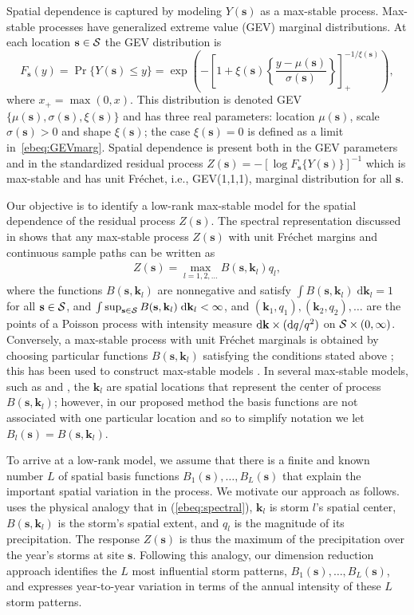\documentclass[12pt]{article}
\newcommand{\bk}{\ensuremath{\mathbf{k}}}
\newcommand{\bs}{\ensuremath{\mathbf{s}}}
\newcommand{\dd}{\; \text{d} }
\newcommand{\calS}{{\cal S}}
\newcommand{\eref}[1]{(\ref{#1})}
\begin{document}
Spatial dependence is captured by modeling $Y(\bs)$ as a max-stable process.
Max-stable processes have generalized extreme value (GEV) marginal distributions. At each location $\bs\in\calS$ the GEV distribution is
\begin{equation}\label{ebeq:GEVmarg}
F_{\bs}(y) =  \Pr\{Y(\bs) \leq y \}  = \exp \left(- \left[1 + \xi(\bs) \left\{\dfrac{y - \mu(\bs)}{\sigma(\bs)}\right\}\right]_+^{-1/\xi(\bs)}\right),
\end{equation}
where $x_+=\max(0,x)$. This distribution is denoted GEV$\{\mu(\bs),\sigma(\bs),\xi(\bs)\}$ and has three real parameters: location $\mu(\bs)$, scale $\sigma(\bs)>0$ and shape $\xi(\bs)$; the case $\xi(\bs)=0$ is defined as a limit in~\eqref{ebeq:GEVmarg}.
Spatial dependence is present both in the GEV parameters and in the standardized residual process  $Z(\bs) =  - \left[ \log F_{\bs}\{Y(\bs)\} \right]^{-1}$ which is max-stable and has unit Fr\'echet, i.e., GEV(1,1,1), marginal distribution for all $\bs$.

Our objective is to identify a low-rank max-stable model for the spatial dependence of the residual process $Z(\bs)$.
The spectral representation discussed in \citet[Theorem~9.6.1]{deHaan2006} shows that any max-stable process $Z(\bs)$ with unit Fr\'echet margins and continuous sample paths can be written as
\begin{align}\label{ebeq:spectral}
  Z(\bs) = \max_{l = 1,2,\ldots} B(\bs, \bk_l)q_{l},
\end{align}
where the functions $B(\bs, \bk_l)$ are nonnegative and satisfy $\int B(\bs, \bk_l) \dd \bk_l = 1$ for all $\bs\in\calS$, and $\int \sup_{\bs\in\calS} B(\bs, \bk_l) \dd \bk_l < \infty$, and $(\bk_1, q_1),  (\bk_2, q_2), \ldots$ are the points of a Poisson process with intensity measure ${\rm d}\bk\times ({\rm d} q/q^2)$ on $\calS \times (0,\infty)$. Conversely, a max-stable process with unit Fr\'echet marginals is obtained by choosing particular functions $B(\bs, \bk_l)$ satisfying the conditions stated above \citep[Theorem~9.6.1]{deHaan2006}; this has been used to construct max-stable models \citep[e.g.,][]{Smith1990,Schlather2002,Kabluchko2009}. In several max-stable models, such as \citet{Smith1990} and \citet{Reich2012}, the $\bk_l$ are spatial locations that represent the center of process $B(\bs ,\bk_l)$; however, in our proposed method the basis functions are not associated with one particular location and so to simplify notation we let $B_l(\bs) = B(\bs, \bk_l)$.

To arrive at a low-rank model, we assume that there is a finite and known number $L$ of spatial basis functions $B_1(\bs), \ldots, B_L(\bs)$ that explain the important spatial variation in the process. We motivate our approach as follows. \citet{Smith1990} uses the physical analogy that in \eref{ebeq:spectral}, $\bk_l$ is storm $l$'s spatial center, $B(\bs, \bk_l)$ is the storm's spatial extent, and $q_l$ is the magnitude of its precipitation.  The response $Z(\bs)$ is thus the maximum of the precipitation over the year's storms at site $\bs$. Following this analogy, our dimension reduction approach identifies the $L$ most influential storm patterns, $B_1(\bs),\ldots,B_L(\bs)$, and expresses year-to-year variation in terms of the annual intensity of these $L$ storm patterns.
\end{document}
